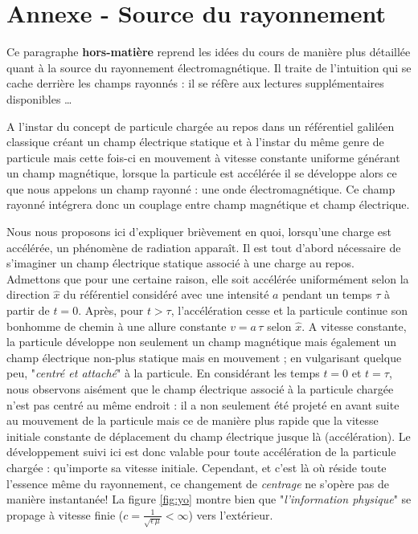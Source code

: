 \chapter{Annexe - Source du rayonnement}
Ce paragraphe \textbf{hors-matière} reprend les idées du cours de manière plus détaillée quant à la source du rayonnement électromagnétique. Il traite de l'intuition qui se cache derrière les champs rayonnés : il se réfère aux lectures supplémentaires disponibles \dots

A l'instar du concept de particule chargée au repos dans un référentiel galiléen classique créant un champ électrique statique et à l'instar du même genre de particule mais cette fois-ci en mouvement à vitesse constante uniforme générant un champ magnétique, lorsque la particule est accélérée il se développe alors ce que nous appelons un champ rayonné : une onde électromagnétique. Ce champ rayonné intégrera donc un couplage entre champ magnétique et champ électrique.

Nous nous proposons ici d'expliquer brièvement en quoi, lorsqu'une charge est accélérée, un phénomène de radiation apparaît. Il est tout d'abord nécessaire de s'imaginer un champ électrique statique associé à une charge au repos. Admettons que pour une certaine raison, elle soit accélérée uniformément selon la direction $\hat{x}$ du référentiel considéré avec une intensité $a$ pendant un temps $\tau$ à partir de $t = 0$. Après, pour $t>\tau$, l'accélération cesse et la particule continue son bonhomme de chemin à une allure constante $v = a\,\tau$ selon $\hat{x}$. A vitesse constante, la particule développe non seulement un champ magnétique mais également un champ électrique non-plus statique mais en mouvement ; en vulgarisant quelque peu, "\textit{centré et attaché}" à la particule. En considérant les temps $t = 0$ et $t = \tau$, nous observons aisément que le champ électrique associé à la particule chargée n'est pas centré au même endroit : il a non seulement été projeté en avant suite au mouvement de la particule mais ce de manière plus rapide que la vitesse initiale constante de déplacement du champ électrique jusque là (accélération). Le développement suivi ici est donc valable pour toute accélération de la particule chargée : qu'importe sa vitesse initiale. Cependant, et c'est là où réside toute l'essence même du rayonnement, ce changement de \textit{centrage} ne s'opère pas de manière instantanée! La figure \ref{fig:yo} montre bien que "\textit{l'information physique}" se propage à vitesse finie ($c = \frac{1}{\sqrt{\epsilon\,\mu}} < \infty $) vers l'extérieur.

